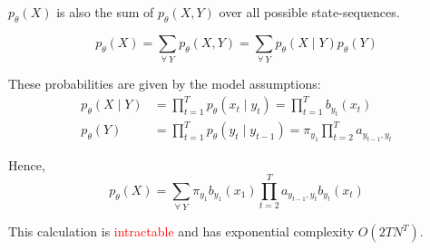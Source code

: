 \documentclass[envcountsect]{beamer}
\newcommand{\boldX}{X}
\newcommand{\boldY}{Y}
\newcommand{\ptheta}{p_\theta}
\begin{document}
\begin{frame}

$\ptheta(\boldX)$ is also the sum of $\ptheta(\boldX, \boldY)$ over all possible state-sequences.

\begin{equation*}
    \ptheta(\boldX) = \sum_{\forall \: \boldY} \ptheta(\boldX,\boldY) = \sum_{\forall \: \boldY} \ptheta(\boldX \mid \boldY) \ptheta(\boldY)
\end{equation*}

\pause

These probabilities are given by the model assumptions:
\begin{align*}
    \ptheta(\boldX \mid \boldY) &= \prod_{t=1}^T \ptheta(x_t \mid y_t) = \prod_{t=1}^T b_{y_t}(x_t) \\
    \ptheta(\boldY) &= \prod_{t=1}^T \ptheta(y_t \mid y_{t-1}) = \pi_{y_1} \prod_{t=2}^T a_{y_{t-1},y_{t}}
\end{align*}

\pause

Hence,
\begin{equation*}
       \ptheta(\boldX) = \sum_{\forall \: \boldY} \pi_{y_1} b_{y_1}(x_1) \prod_{t=2}^T a_{y_{t-1},y_t} b_{y_t}(x_t) %
\end{equation*}

\pause

This calculation is \textcolor{red}{intractable} and has exponential complexity $O(2TN^T)$.

\end{frame}
\end{document}
